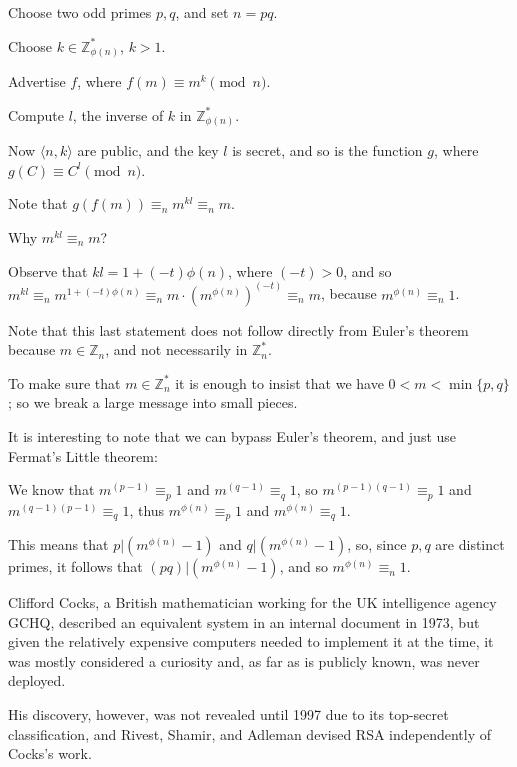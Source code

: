 \begin{frame}
Choose two odd primes $p,q$, and set $n=pq$.  

Choose $k\in\mathbb{Z}^*_{\phi(n)}$, $k>1$.  

Advertise $f$, where $f(m)\equiv m^k\pmod n$.  

Compute $l$, the inverse of $k$ in $\mathbb{Z}^*_{\phi(n)}$.

Now $\langle n,k\rangle$ are public, and the key $l$ is secret, and so
is the function $g$, where $g(C)\equiv C^l\pmod n$.  

Note that $g(f(m))\equiv_n m^{kl}\equiv_n m$.
\end{frame}

\begin{frame}
Why $m^{kl}\equiv_n m$?  

Observe that
$kl=1+(-t)\phi(n)$, where $(-t)>0$,
and so $m^{kl}\equiv_n m^{1+(-t)\phi(n)}\equiv_n m\cdot
(m^{\phi(n)})^{(-t)}\equiv_n m$, because $m^{\phi(n)}\equiv_n 1$.

Note that this last statement does not follow
directly from Euler's theorem
because $m\in\mathbb{Z}_n$, and not
necessarily in $\mathbb{Z}^*_n$.

To make sure that $m\in\mathbb{Z}^*_n$ it is enough to insist that
we have $0<m<\min\{p,q\}$; so we
break a large message into small pieces.  
\end{frame}

\begin{frame}
It is interesting to note that we can bypass Euler's theorem, and
just use
Fermat's Little
theorem: 

We know that $m^{(p-1)}\equiv_p 1$ and $m^{(q-1)}\equiv_q 1$,
so $m^{(p-1)(q-1)}\equiv_p 1$ and $m^{(q-1)(p-1)}\equiv_q 1$, thus
$m^{\phi(n)}\equiv_p 1$ and $m^{\phi(n)}\equiv_q 1$.  

This means that
$p|(m^{\phi(n)}-1)$ and $q|(m^{\phi(n)}-1)$, so, since $p,q$ are
distinct primes, it follows that $(pq)|(m^{\phi(n)}-1)$, and so
$m^{\phi(n)}\equiv_n 1$.
\end{frame}

\begin{frame}
Clifford Cocks, a British mathematician working for the UK
intelligence agency GCHQ, described an equivalent system in an
internal document in 1973, but given the relatively expensive
computers needed to implement it at the time, it was mostly considered
a curiosity and, as far as is publicly known, was never deployed. 

His discovery, however, was not revealed until 1997 due to its
top-secret classification, and Rivest, Shamir, and Adleman devised RSA
independently of Cocks's work.
\end{frame}


